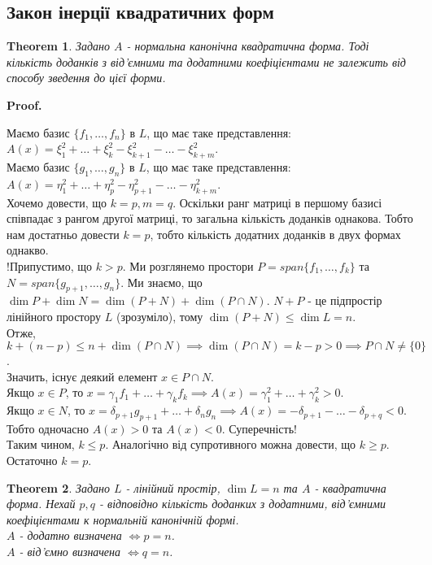 \documentclass[a4paper, 10pt]{article}
\makeatletter
\def\qed{$\blacksquare$}
\theoremstyle{theoremdd}
\newtheorem{theorem}{Theorem}[subsection]
\theoremstyle{theoremdd}
\theoremstyle{theoremdd}
\theoremstyle{theoremdd}
\theoremstyle{theoremdd}
\theoremstyle{theoremdd}
\theoremstyle{theoremdd}
\theoremstyle{theoremdd}
\renewenvironment{proof}[1][Proof.\\]{\par
\pushQED{\hfill \qed}%
\normalfont \topsep6\p@\@plus6\p@\relax
\trivlist
\item\relax
{\bfseries
#1\@addpunct{.}}\hspace\labelsep\ignorespaces
}{%
\popQED\endtrivlist\@endpefalse
}
\makeatother
\begin{document}
\subsection{Закон інерції квадратичних форм}
\begin{theorem}
Задано $A$ - нормальна канонічна квадратична форма. Тоді кількість доданків з від'ємними та додатними коефіцієнтами не залежить від способу зведення до цієї форми.
\end{theorem}

\begin{proof}
Маємо базис $\{f_1,\dots,f_n\}$ в $L$, що має таке представлення: $A(x) = \xi_1^2 + \dots + \xi_k^2 - \xi_{k+1}^2 - \dots - \xi_{k+m}^2$.\\
Маємо базис $\{g_1,\dots,g_n\}$ в $L$, що має таке представлення: $A(x) = \eta_1^2 + \dots + \eta_p^2 - \eta_{p+1}^2 - \dots - \eta_{k+m}^2$.\\
Хочемо довести, що $k=p, m=q$. Оскільки ранг матриці в першому базисі співпадає з рангом другої матриці, то загальна кількість доданків однакова. Тобто нам достатньо довести $k=p$, тобто кількість додатних доданків в двух формах однакво.\\
!Припустимо, що $k > p$. Ми розглянемо простори $P = span\{f_1,\dots,f_k\}$ та $N = span\{g_{p+1},\dots,g_n\}$. Ми знаємо, що $\dim P + \dim N = \dim (P+N) + \dim (P \cap N)$. $N+P$ - це підпростір лінійного простору $L$ (зрозуміло), тому $\dim (P+N) \leq \dim L = n$.\\
Отже, $k + (n-p) \leq n + \dim (P \cap N) \implies \dim (P \cap N) = k - p > 0 \implies P \cap N \neq \{0\}$.\\
Значить, існує деякий елемент $x \in P \cap N$. \\
Якщо $x \in P$, то $x = \gamma_1 f_1 + \dots + \gamma_k f_k \implies A(x) = \gamma_1^2 + \dots + \gamma_k^2 > 0$.\\
Якщо $x \in N$, то $x = \delta_{p+1} g_{p+1} + \dots + \delta_n g_n \implies A(x) = -\delta_{p+1} - \dots - \delta_{p+q} < 0$.\\
Тобто одночасно $A(x) > 0$ та $A(x) < 0$. Суперечність!\\
Таким чином, $k \leq p$. Аналогічно від супротивного можна довести, що $k \geq p$. Остаточно $k=p$. 
\end{proof}

\begin{theorem}
Задано $L$ - лінійний простір, $\dim L = n$ та $A$ - квадратична форма. Нехай $p,q$ - відповідно кількість доданких з додатними, від'ємними коефіцієнтами к нормальній канонічній формі.\\
$A$ - додатно визначена $\iff p = n$.\\
$A$ - від'ємно визначена $\iff q = n$.
\end{theorem}
\end{document}
